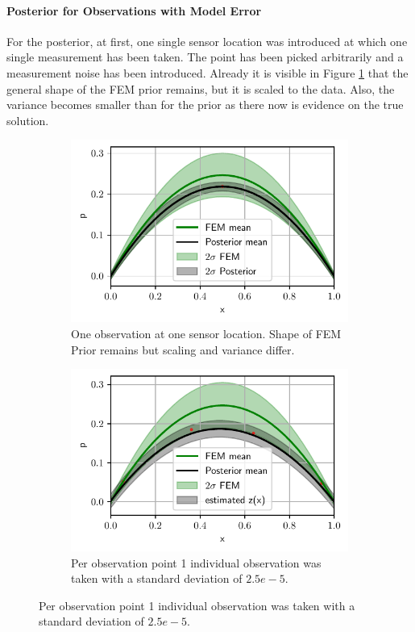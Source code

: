 \documentclass[%
  a4paper,oneside,%
  11pt,%
  smallchapters,
  style=printdev,
  extramargin,
  green,%
  rgb, <cmyk>
  ]{tubsbook}
\begin{document}
\FloatBarrier
\paragraph{Posterior for Observations with Model Error}
For the posterior, at first, one single sensor location was introduced at which one single measurement has been taken. The point has been picked arbitrarily and a measurement noise has been introduced. Already it is visible in Figure \ref{fig:ModelError1Da} that the general shape of the FEM prior remains, but it is scaled to the data. Also, the variance becomes smaller than for the prior as there now is evidence on the true solution.
%
\begin{figure}[!ht]

\centering

	\begin{subfigure}[t]{.5\textwidth}
	\centering
	\includegraphics[width=1\linewidth]{../../Python/Results/1D/Model_Error/1o_1s/Result.pdf}
	\caption{One observation at one sensor location. Shape of FEM Prior remains but scaling and variance differ.}	
	\label{fig:ModelError1Da}
	\end{subfigure}%
	\begin{subfigure}[t]{.5\textwidth}
	\centering
	\includegraphics[width=1\linewidth]{../../Python/Results/1D/Model_Error/1o_4s/Result.pdf}
	\caption{Per observation point 1 individual observation was taken with a standard deviation of $2.5e-5$. }	
	\label{fig:ModelError1Db}
	\end{subfigure}
	

\end{figure}
\end{document}

